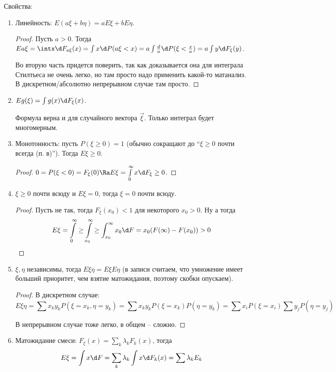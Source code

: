 Свойства:
\begin{enumerate}
\item Линейность: $E(a\xi + b\eta) = aE\xi + bE\eta$.
\begin{proof}
Пусть $a > 0$. Тогда $Ea\xi = \intx \d F_{a\xi}(x) = \int x \d P(a\xi < x) = a \int \frac{d}{a} \d P(\xi < \frac{x}{a}) = a \int y \d F_\xi(y)$.

Во вторую часть придется поверить, так как доказывается она для интеграла Стилтьеса не очень легко, но там просто надо применить какой-то матанализ.
В дискретном/абсолютно непрерывном случае там просто.
\end{proof}
\item $Eg(\xi) = \int g(x) \d F_\xi(x)$.
\begin{Rem}
Формула верна и для случайного вектора $\vec{\xi}$. Только интеграл будет многомерным.
\end{Rem}

\item Монотонность: пусть $P(\xi \geq 0) = 1$ (обычно сокращают до ``$\xi \geq 0$ почти всегда (п. в)''). Тогда $E\xi \geq 0$.
\begin{proof}
$0 = P(\xi < 0) = F_\xi(0) \Ra E\xi = \int\limits_0^{\infty}x \d F_\xi \geq 0$.
\end{proof}

\item $\xi \geq 0$ почти всюду и $E\xi = 0$, тогда $\xi = 0$ почти всюду.
\begin{proof}
Пусть не так, тогда $F_\xi(x_0) < 1$ для некоторого $x_0 > 0$. 
Ну а тогда $$E\xi = \int\limits_0^{\infty} \geq \int\limits_{x_0}^\infty \geq  \int_{x_0}^\infty x_0 \d F = x_0 (F(\infty) - F(x_0)) > 0$$
\end{proof}

\item $\xi, \eta$ независимы, тогда $E\xi\eta = E\xi E\eta$ (в записи считаем, что умножение имеет больший приоритет, чем взятие матожидания, поэтому скобки опускаем).
\begin{proof}
В дискретном случае: $$E\xi\eta = \sum x_k y_k P(\xi = x_k, \eta = y_k) = \sum x_k y_k P(\xi = x_k) P(\eta = y_k) = \sum x_i P(\xi = x_i) \sum y_j P(\eta = y_j)$$

В непрерывном случае тоже легко, в общем -- сложно.
\end{proof}

\item Матожидание смеси: $F_\xi(x) = \sum\limits_k \lambda_kF_k(x)$, тогда $$E\xi = \int x \d F = \sum\limits_k \lambda_k \int x \d F_k(x) = \sum \lambda_k E_k$$
\end{enumerate}


